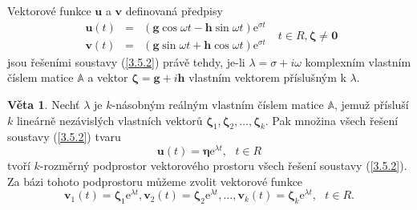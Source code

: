 \documentclass[a4paper, 12pt]{book}
\theoremstyle{definition}
\newtheorem{theorem}{Věta}[section]
\def\vc#1{\mathbf{\boldsymbol{#1}}}     %
\def\tn#1{{\mathbb{#1}}}    %
\begin{document}
Vektorové funkce $\vc u$ a $\vc v$ definovaná předpisy
\begin{equation}
\begin{array}{rcl}
\vc u(t)&=&(\vc g\cos\omega t - \vc h\sin\omega t)\mathrm{e}^{\sigma t}\\
\vc v(t)&=&(\vc g\sin\omega t + \vc h\cos\omega t)\mathrm{e}^{\sigma t}
\end{array}
~~~t\in R, \vc\zeta\neq\vc 0
\end{equation}
jsou řešeními soustavy (\ref{3.5.2}) právě tehdy, je-li $\lambda=\sigma + i\omega$ 
komplexním vlastním číslem matice $\tn A$ a vektor $\vc\zeta=\vc g+i \vc h$ 
vlastním vektorem příslušným k $\lambda$.

\begin{theorem}
Nechť $\lambda$ je $k$-násobným reálným vlastním číslem matice $\tn A$, jemuž 
přísluší $k$ lineárně nezávislých vlastních vektorů $\vc\zeta_1, \vc\zeta_2, 
\dots,\vc\zeta_k$. Pak množina všech řešení soustavy (\ref{3.5.2}) tvaru
\begin{equation}
\vc u(t)=\vc\eta\mathrm{e}^{\lambda t},~~~t\in R
\end{equation}
tvoří $k$-rozměrný podprostor vektorového prostoru všech řešení soustavy 
(\ref{3.5.2}). Za bázi tohoto podprostoru můžeme zvolit vektorové funkce 
\begin{equation}
\vc v_1(t)=\vc\zeta_1\mathrm{e}^{\lambda t},
\vc v_2(t)=\vc\zeta_2\mathrm{e}^{\lambda t},
\dots,
\vc v_k(t)=\vc\zeta_k\mathrm{e}^{\lambda t},~~~t\in R.
\end{equation}
\end{theorem}
\end{document}
